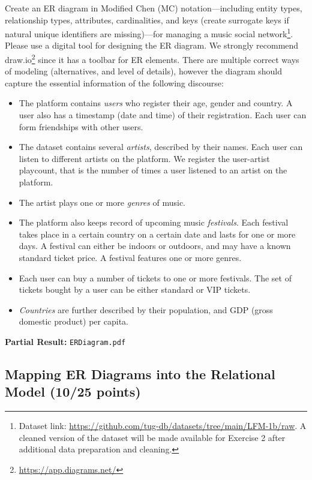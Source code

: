 \documentclass[
        a4paper,
        pdftex,
        english, 
        oneside,%
        listof=totoc,%
        bibliography=totoc, %
        titlepage,
        abstracton 
]{scrartcl} %
\begin{document}
Create an ER diagram in Modified Chen (MC) notation---including entity types, relationship types, attributes, cardinalities, and keys (create surrogate keys if natural unique identifiers are missing)---for managing a music social network\footnote{Dataset link: \url{https://github.com/tug-db/datasets/tree/main/LFM-1b/raw}. A cleaned version of the dataset will be made available for Exercise 2 after additional data preparation and cleaning.}.
Please use a digital tool for designing the ER diagram. We strongly recommend draw.io\footnote{\url{https://app.diagrams.net/}} since it has a toolbar for ER elements.
There are multiple correct ways of modeling (alternatives, and level of details), however the diagram should capture the essential information of the following discourse:
\begin{itemize}
\item The platform contains \textit{users} who register their age, gender and country. A user also has a timestamp (date and time) of their registration. Each user can form friendships with other users.
\item The dataset contains several \textit{artists}, described by their names. Each user can listen to different artists on the platform. We register the user-artist playcount, that is the number of times a user listened to an artist on the platform.
\item The artist plays one or more \textit{genres} of music.
\item The platform also keeps record of upcoming music \textit{festivals}. Each festival takes place in a certain country on a certain date and lasts for one or more days. A festival can either be indoors or outdoors, and may have a known standard ticket price. A festival features one or more genres.
\item Each user can buy a number of tickets to one or more festivals. The set of tickets bought by a user can be either standard or VIP tickets.
\item \textit{Countries} are further described by their population, and GDP (gross domestic product) per capita.
\end{itemize}

\noindent \textbf{Partial Result:} \texttt{ERDiagram.pdf}

\subsection{Mapping ER Diagrams into the Relational Model (10/25 points)}
\label{sec:RM}
\end{document}
